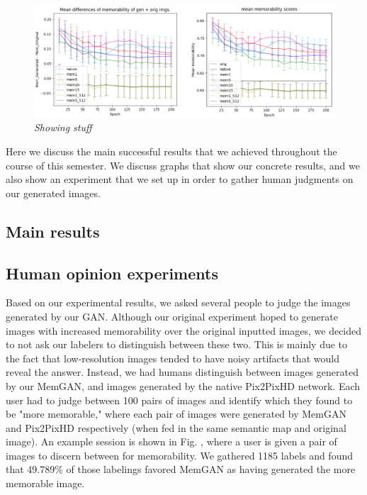 \documentclass[10pt,twocolumn,letterpaper]{article}
\begin{document}
\begin{figure}
    \centering
    \label{pic3}
    \includegraphics[width=\linewidth]{pic3.png}
    \caption{\textit{Showing stuff}}
\end{figure}


Here we discuss the main successful results that we achieved throughout the course of this semester. We discuss graphs that show our concrete results, and we also show an experiment that we set up in order to gather human judgments on our generated images.

\subsection{Main results}

\subsection{Human opinion experiments}
Based on our experimental results, we asked several people to judge the images generated by our GAN. Although our original experiment hoped to generate images with increased memorability over the original inputted images, we decided to not ask our labelers to distinguish between these two. This is mainly due to the fact that low-resolution images tended to have noisy artifacts that would reveal the answer. Instead, we had humans distinguish between images generated by our MemGAN, and images generated by the native Pix2PixHD network. Each user had to judge between 100 pairs of images and identify which they found to be "more memorable," where each pair of images were generated by MemGAN and Pix2PixHD respectively (when fed in the same semantic map and original image). An example session is shown in Fig. \cite{}, where a user is given a pair of images to discern between for memorability. We gathered 1185 labels and found that 49.789\% of those labelings favored MemGAN as having generated the more memorable image. \\
\end{document}
